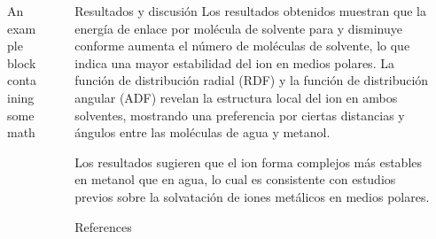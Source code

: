 \documentclass[final]{beamer}
\newlength{\sepwidth}
\newlength{\colwidth}
\newcommand{\separatorcolumn}{\begin{column}{\sepwidth}\end{column}}
\begin{document}
\begin{frame}[t]
\begin{columns}[t]
\begin{column}{\colwidth}
\begin{block}{An example block containing some math}{}
			\end{block}		

		\end{column}
	
		\separatorcolumn
		
		\begin{column}{\colwidth}

			\begin{exampleblock}{Resultados y discusión}
				Los resultados obtenidos muestran que la energía de enlace por molécula de solvente para  y  disminuye conforme aumenta el número de moléculas de solvente, lo que indica una mayor estabilidad del ion en medios polares. La función de distribución radial (RDF) y la función de distribución angular (ADF) revelan la estructura local del ion  en ambos solventes, mostrando una preferencia por ciertas distancias y ángulos entre las moléculas de agua y metanol.

				Los resultados sugieren que el ion  forma complejos más estables en metanol que en agua, lo cual es consistente con estudios previos sobre la solvatación de iones metálicos en medios polares.

				
			\end{exampleblock}					

			
			\begin{block}{References}
				\printbibliography[heading=none]
			\end{block}
		\end{column}
		
		\separatorcolumn
	\end{columns}
\end{frame}
\end{document}
